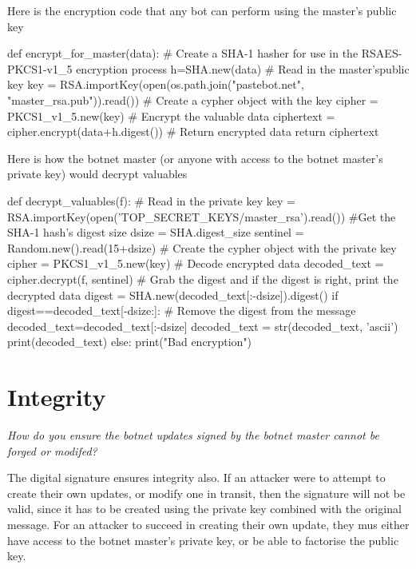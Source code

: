 \documentclass[9pt,a4paper]{article}
\begin{document}
Here is the encryption code that any bot can perform using the master's public key
\begin{center}
\begin{python}
def encrypt_for_master(data):
    # Create a SHA-1 hasher for use in the RSAES-PKCS1-v1_5 encryption process
    h=SHA.new(data)
    # Read in the master'spublic key
    key = RSA.importKey(open(os.path.join("pastebot.net", "master_rsa.pub")).read())
    # Create a cypher object with the key
    cipher = PKCS1_v1_5.new(key)
    # Encrypt the valuable data
    ciphertext = cipher.encrypt(data+h.digest())
    # Return encrypted data
    return ciphertext
\end{python}
\end{center}

Here is how the botnet master (or anyone with access to the botnet master's private key) would decrypt valuables
\begin{center}
\begin{python}
def decrypt_valuables(f):
    # Read in the private key
    key = RSA.importKey(open('TOP_SECRET_KEYS/master_rsa').read())
    #Get the SHA-1 hash's digest size
    dsize = SHA.digest_size
    sentinel = Random.new().read(15+dsize)
    # Create the cypher object with the private key
    cipher = PKCS1_v1_5.new(key)
    # Decode encrypted data
    decoded_text = cipher.decrypt(f, sentinel)
    # Grab the digest and if the digest is right, print the decrypted data
    digest = SHA.new(decoded_text[:-dsize]).digest()
    if digest==decoded_text[-dsize:]:
        # Remove the digest from the message
        decoded_text=decoded_text[:-dsize]
        decoded_text = str(decoded_text, 'ascii')
        print(decoded_text)
    else:
        print("Bad encryption")
\end{python}
\end{center}


\section{Integrity}

\emph{ How do you ensure the botnet updates signed by the botnet master cannot be forged or modifed?}


The digital signature ensures integrity also. If an attacker were to attempt to create their own updates, or modify one in transit, then the signature will not be valid, since it has to be created using the private key combined with the original message. For an attacker to succeed in creating their own update, they mus either have access to the botnet master's private key, or be able to factorise the public key.
\end{document}
